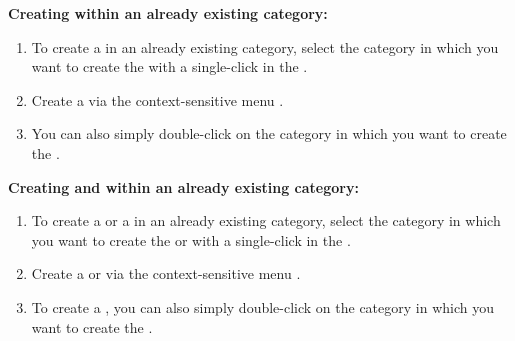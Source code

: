 \textbf{Creating \gdcases{} within an already existing category:}
\begin{enumerate}
\item To create a \gdcase{} in an already existing category, select the category in which you want to create the \gdcase{} with a single-click in the \gdtestcasebrowser{}. 
\item Create a \gdcase{} via the context-sensitive menu .
\item You can also simply double-click on the category in which you want to create the \gdcase{}. 
\end{enumerate}

\textbf{Creating \gdsuites{} and \gdjobs{} within an already existing category:}
\begin{enumerate}
\item To create a \gdsuite{} or a \gdjob{} in an already existing category, select the category in which you want to create the \gdsuite{} or \gdjob{}  with a single-click in the \gdtestsuitebrowser{}. 
\item Create a \gdsuite{} or \gdjob{} via the context-sensitive menu .
\item To create a \gdsuite{}, you can also simply double-click on the category in which you want to create the \gdsuite{}. 
\end{enumerate}
